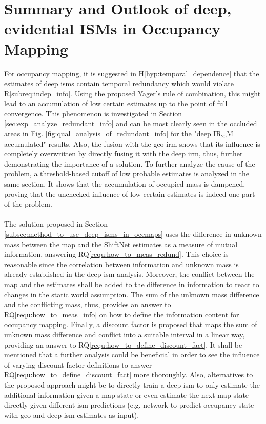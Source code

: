 \section{Summary and Outlook of deep, evidential ISMs in Occupancy Mapping}
\label{sec:disc_deep_ev_isms_in_occ_maps}
For occupancy mapping, it is suggested in H\ref{hyp:temporal_dependence} that the estimates of deep \gls{ism}s contain temporal redundancy which would violate R\ref{subreq:indep_info}. Using the proposed Yager's rule of combination, this might lead to an accumulation of low certain estimates up to the point of full convergence. This phenomenon is investigated in Section \ref{sec:exp_analyze_redundant_info} and can be most clearly seen in the occluded areas in Fig. \ref{fig:qual_analysis_of_redundant_info} for the "deep IR$_{20}$M accumulated" results. Also, the fusion with the geo \gls{irm} shows that its influence is completely overwritten by directly fusing it with the deep \gls{irm}, thus, further demonstrating the importance of a solution. To further analyze the cause of the problem, a threshold-based cutoff of low probable estimates is analyzed in the same section. It shows that the accumulation of occupied mass is dampened, proving that the unchecked influence of low certain estimates is indeed one part of the problem.
\\\\
The solution proposed in Section \ref{subsec:method_to_use_deep_isms_in_occmaps} uses the difference in unknown mass between the map and the ShiftNet estimates as a measure of mutual information, answering RQ\ref{requ:how_to_meas_redund}. This choice is reasonable since the correlation between information and unknown mass is already established in the deep \gls{ism} analysis. Moreover, the conflict between the map and the estimates shall be added to the difference in information to react to changes in the static world assumption. The sum of the unknown mass difference and the conflicting mass, thus, provides an answer to RQ\ref{requ:how_to_meas_info} on how to define the information content for occupancy mapping. Finally, a discount factor is proposed that maps the sum of unknown mass difference and conflict into a suitable interval in a linear way, providing an answer to RQ\ref{requ:how_to_define_discount_fact}. It shall be mentioned that a further analysis could be beneficial in order to see the influence of varying discount factor definitions to answer RQ\ref{requ:how_to_define_discount_fact} more thoroughly. Also, alternatives to the proposed approach might be to directly train a deep \gls{ism} to only estimate the additional information given a map state or even estimate the next map state directly given different \gls{ism} predictions (e.g. network to predict occupancy state with geo and deep \gls{ism} estimates as input).
